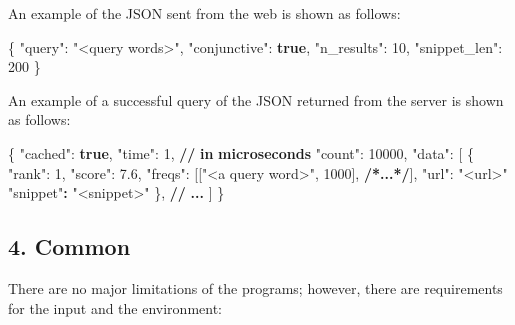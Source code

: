 \documentclass[12pt]{article}
\newenvironment{Shaded}{}{}
\newcommand{\DataTypeTok}[1]{\textcolor[rgb]{0.56,0.13,0.00}{\footnotesize #1}}
\newcommand{\DecValTok}[1]{\textcolor[rgb]{0.25,0.63,0.44}{\footnotesize #1}}
\newcommand{\ErrorTok}[1]{\textcolor[rgb]{1.00,0.00,0.00}{\textbf{\footnotesize #1}}}
\newcommand{\FloatTok}[1]{\textcolor[rgb]{0.25,0.63,0.44}{\footnotesize #1}}
\newcommand{\FunctionTok}[1]{\textcolor[rgb]{0.02,0.16,0.49}{\footnotesize #1}}
\newcommand{\KeywordTok}[1]{\textcolor[rgb]{0.00,0.44,0.13}{\textbf{\footnotesize #1}}}
\newcommand{\OtherTok}[1]{\textcolor[rgb]{0.00,0.44,0.13}{\footnotesize #1}}
\newcommand{\StringTok}[1]{\textcolor[rgb]{0.25,0.44,0.63}{\footnotesize #1}}
\begin{document}
An example of the JSON sent from the web is shown as follows:

\begin{Shaded}
\begin{Highlighting}[]
\FunctionTok{\{}
    \DataTypeTok{"query"}\FunctionTok{:} \StringTok{"\textless{}query words\textgreater{}"}\FunctionTok{,}
    \DataTypeTok{"conjunctive"}\FunctionTok{:} \KeywordTok{true}\FunctionTok{,}
    \DataTypeTok{"n\_results"}\FunctionTok{:} \DecValTok{10}\FunctionTok{,}
    \DataTypeTok{"snippet\_len"}\FunctionTok{:} \DecValTok{200}
\FunctionTok{\}}
\end{Highlighting}
\end{Shaded}

An example of a successful query of the JSON returned from the server is
shown as follows:

\begin{Shaded}
\begin{Highlighting}[]
\FunctionTok{\{}
    \DataTypeTok{"cached"}\FunctionTok{:} \KeywordTok{true}\FunctionTok{,}
    \DataTypeTok{"time"}\FunctionTok{:} \DecValTok{1}\FunctionTok{,} \ErrorTok{//} \ErrorTok{in} \ErrorTok{microseconds}
    \DataTypeTok{"count"}\FunctionTok{:} \DecValTok{10000}\FunctionTok{,}
    \DataTypeTok{"data"}\FunctionTok{:} \OtherTok{[}
        \FunctionTok{\{}
            \DataTypeTok{"rank"}\FunctionTok{:} \DecValTok{1}\FunctionTok{,}
            \DataTypeTok{"score"}\FunctionTok{:} \FloatTok{7.6}\FunctionTok{,}
            \DataTypeTok{"freqs"}\FunctionTok{:} \OtherTok{[[}\StringTok{"\textless{}a query word\textgreater{}"}\OtherTok{,} \DecValTok{1000}\OtherTok{],} \ErrorTok{/*...*/}\OtherTok{]}\FunctionTok{,}
            \DataTypeTok{"url"}\FunctionTok{:} \StringTok{"\textless{}url\textgreater{}"}
            \StringTok{"snippet"}\ErrorTok{:} \StringTok{"\textless{}snippet\textgreater{}"}
        \FunctionTok{\}}\OtherTok{,} \ErrorTok{//} \ErrorTok{...}
    \OtherTok{]}
\FunctionTok{\}}
\end{Highlighting}
\end{Shaded}

\hypertarget{4-common}{%
\subsection{4. Common}\label{4-common}}

There are no major limitations of the programs; however, there are
requirements for the input and the environment:
\end{document}
